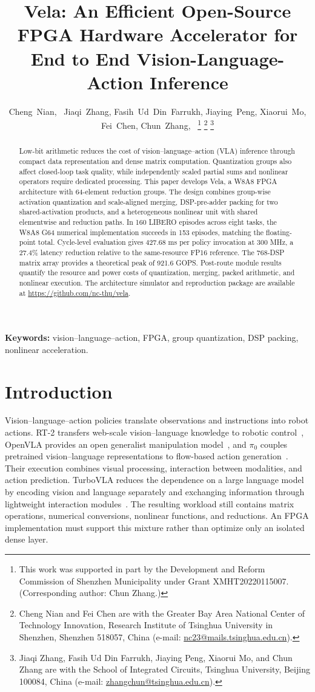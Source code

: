\documentclass[journal,10pt]{IEEEtran}
\title{Vela: An Efficient Open-Source FPGA Hardware Accelerator for End to End Vision-Language-Action Inference  }
\author{Cheng~Nian,~\IEEEmembership{Member,~IEEE,}
Jiaqi~Zhang, Fasih~Ud~Din~Farrukh, Jiaying~Peng, Xiaorui~Mo,\\
Fei~Chen,
Chun~Zhang,~\IEEEmembership{Senior Member,~IEEE}
\thanks{This work was supported in part by the Development and Reform Commission of Shenzhen Municipality under Grant XMHT20220115007. (Corresponding author: Chun Zhang.)}
\thanks{Cheng Nian and Fei Chen are with the Greater Bay Area National Center of Technology Innovation, Research Institute of Tsinghua University in Shenzhen, Shenzhen 518057, China (e-mail: \href{mailto:nc23@mails.tsinghua.edu.cn}{nc23@mails.tsinghua.edu.cn}).}
\thanks{Jiaqi Zhang, Fasih Ud Din Farrukh, Jiaying Peng, Xiaorui Mo, and Chun Zhang are with the School of Integrated Circuits, Tsinghua University, Beijing 100084, China (e-mail: \href{mailto:zhangchun@tsinghua.edu.cn}{zhangchun@tsinghua.edu.cn}).}}
\date{}
\begin{document}
\maketitle
\begin{abstract}
Low-bit arithmetic reduces the cost of vision--language--action (VLA) inference through compact data representation and dense matrix computation. Quantization groups also affect closed-loop task quality, while independently scaled partial sums and nonlinear operators require dedicated processing. This paper develops Vela, a W8A8 FPGA architecture with 64-element reduction groups. The design combines group-wise activation quantization and scale-aligned merging, DSP-pre-adder packing for two shared-activation products, and a heterogeneous nonlinear unit with shared elementwise and reduction paths. In 160 LIBERO episodes across eight tasks, the W8A8 G64 numerical implementation succeeds in 153 episodes, matching the floating-point total. Cycle-level evaluation gives 427.68 ms per policy invocation at 300 MHz, a 27.4\% latency reduction relative to the same-resource FP16 reference. The 768-DSP matrix array provides a theoretical peak of 921.6 GOPS. Post-route module results quantify the resource and power costs of quantization, merging, packed arithmetic, and nonlinear execution.
The architecture simulator and reproduction package are available at \url{https://github.com/nc-thu/vela}.
\end{abstract}
\noindent\textbf{Keywords:} vision--language--action, FPGA, group quantization, DSP packing, nonlinear acceleration.

\section{Introduction}\label{sec:intro}
Vision--language--action policies translate observations and instructions into robot actions. RT-2 transfers web-scale vision--language knowledge to robotic control~\cite{zitkovich2023rt2}, OpenVLA provides an open generalist manipulation model~\cite{kim2024openvla}, and $\pi_0$ couples pretrained vision--language representations to flow-based action generation~\cite{black2025pi0}. Their execution combines visual processing, interaction between modalities, and action prediction. TurboVLA reduces the dependence on a large language model by encoding vision and language separately and exchanging information through lightweight interaction modules~\cite{turbovla}. %
The resulting workload still contains matrix operations, numerical conversions, nonlinear functions, and reductions. An FPGA implementation must support this mixture rather than optimize only an isolated dense layer.
\end{document}
